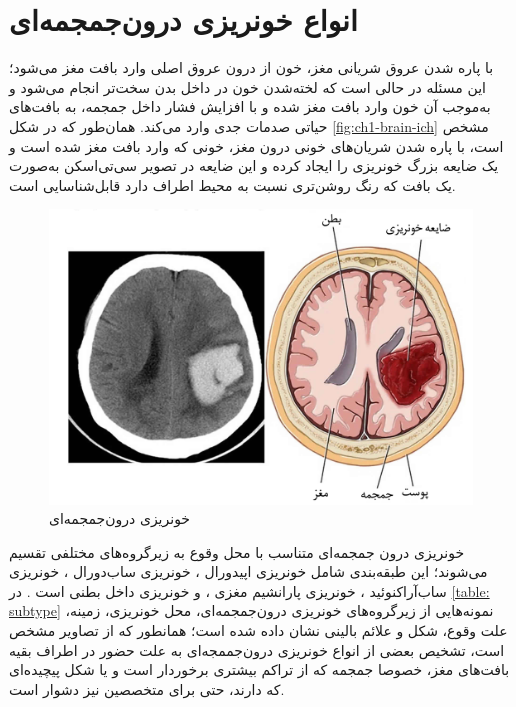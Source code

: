 \section{انواع خونریزی درون‌جمجمه‌ای}
با پاره شدن عروق شریانی مغز، خون از درون عروق اصلی وارد بافت مغز می‌شود؛ این مسئله در حالی است که لخته‌شدن خون در داخل بدن سخت‌‌تر انجام می‌شود و به‌موجب آن خون وارد بافت مغز شده و با افزایش فشار داخل جمجمه، به بافت‌های حیاتی صدمات جدی وارد می‌کند.  
همان‌طور که در شکل
  \autoref{fig:ch1-brain-ich}
  مشخص است، با پاره شدن شریان‌های خونی درون مغز، خونی که وارد بافت مغز شده است و یک ضایعه بزرگ خونریزی را ایجاد کرده و این ضایعه در تصویر سی‌تی‌اسکن به‌صورت یک بافت که رنگ روشن‌تری نسبت به محیط اطراف دارد قابل‌شناسایی است.
   ‎
\begin{figure}[H]
\centering
\includegraphics[width=1.0\linewidth]{"Images/Chapter1/brain - ich"}
\caption{خونریزی درون‌جمجمه‌ای
\cite{healthjade_intracerebral_hemorrhage}}
\label{fig:ch1-brain-ich}
\end{figure}
خونریزی درون جمجمه‌ای متناسب با محل وقوع به زیرگروه‌های مختلفی تقسیم می‌شوند؛
این طبقه‌بندی شامل خونریزی اپیدورال
 ، خونریزی ساب‌دورال
  ، خونریزی ساب‌آراکنوئید
   ، خونریزی پارانشیم مغزی 
   ، و خونریزی داخل بطنی
  است \cite{burduja2020accurate,hssayeni2020intracranial}.
  در
 \autoref{table: subtype}
 نمونه‌هایی از زیرگروه‌های خونریزی درون‌جمجمه‌ای، محل خونریزی، زمینه، علت وقوع، شکل و علائم بالینی نشان داده شده است؛ همانطور که از تصاویر مشخص است، تشخیص بعضی از انواع خونریزی ‌درون‌جممجه‌ای به علت حضور در اطراف بقیه بافت‌های مغز،‌ خصوصا جمجمه که از تراکم بیشتری برخوردار است و یا شکل پیچیده‌ای که دارند، حتی برای متخصصین نیز دشوار است.
  
